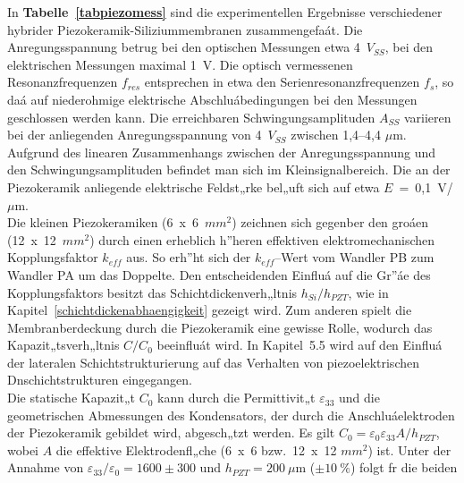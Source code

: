 In {\bf Tabelle~\ref{tabpiezomess}} sind die experimentellen Ergebnisse
verschiedener hybrider Piezokeramik-Siliziummembranen zusammengefaát.
Die Anregungsspannung betrug bei den optischen Messungen etwa 4~$V_{SS}$,
bei den elektrischen Messungen maximal 1~V.
Die optisch vermessenen Resonanzfrequenzen $f_{res}$ entsprechen in
etwa den Serienresonanzfrequenzen $f_{s}$, so daá auf niederohmige
elektrische Abschluábedingungen bei den Messungen geschlossen werden kann.
Die erreichbaren Schwingungsamplituden $A_{SS}$ variieren bei der
anliegenden Anregungsspannung von 4~$V_{SS}$ zwischen 1,4--4,4 $\mu$m.
Aufgrund des linearen Zusammenhangs zwischen der Anregungsspannung und den
Schwingungsamplituden befindet man sich im Kleinsignalbereich. Die an der
Piezokeramik anliegende elektrische Feldst„rke bel„uft sich auf etwa
$E$~=~0,1~V/$\mu$m.\\
Die kleinen Piezokeramiken (6~x~6~$mm^{2}$) zeichnen sich gegenber den
groáen (12~x~12~$mm^{2}$) durch einen erheblich h”heren effektiven
elektromechanischen Kopplungsfaktor $k_{eff}$ aus. So erh”ht sich der
$k_{eff}$--Wert vom Wandler PB zum Wandler PA um das Doppelte. Den
entscheidenden Einfluá auf die Gr”áe des Kopplungsfaktors besitzt das
Schichtdickenverh„ltnis $h_{Si}/h_{PZT}$, wie in
Kapitel~\ref{schichtdickenabhaengigkeit} gezeigt wird. Zum anderen spielt
die Membranberdeckung durch die Piezokeramik eine gewisse Rolle, wodurch
das Kapazit„tsverh„ltnis $C/C_{0}$ beeinfluát wird.
In Kapitel~5.5 wird auf den Einfluá der lateralen Schichtstrukturierung
auf das Verhalten von piezoelektrischen Dnschichtstrukturen
eingegangen.\\
Die statische Kapazit„t $C_{0}$ kann durch
die Permittivit„t $\varepsilon_{33}$ und die geometrischen Abmessungen
des Kondensators, der durch die Anschluáelektroden der Piezokeramik
gebildet wird, abgesch„tzt werden. Es gilt
$C_{0}= \varepsilon_{0} \varepsilon_{33} A / h_{PZT}$, wobei
$A$ die effektive Elektrodenfl„che (6~x~6 bzw.\ 12~x~12 $mm^{2}$) ist.
Unter der Annahme von $\varepsilon_{33} / \varepsilon_{0} = 1600\pm300$
und $h_{PZT} = 200~\mu$m ($\pm10~\%$) folgt fr die beiden
